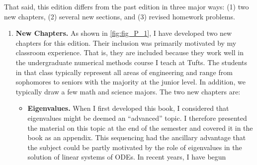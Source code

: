 \documentclass[../main.tex]{subfiles}
\begin{document}
That said, this edition differs from the past edition in three major ways: (1) two new
chapters, (2) several new sections, and (3) revised homework problems.
\begin{enumerate}
	\item  \textbf{New Chapters.} As shown in \ref{fig:fig_P_1}, I have developed two new chapters for this edition. Their inclusion was primarily motivated by my classroom experience. That is,
they are included because they work well in the undergraduate numerical methods
course I teach at Tufts. The students in that class typically represent all areas of engineering and range from sophomores to seniors with the majority at the junior level. In
addition, we typically draw a few math and science majors. The two new chapters are:
\begin{itemize}
	\item \textbf{Eigenvalues.} When I first developed this book, I considered that eigenvalues might
be deemed an “advanced” topic. I therefore presented the material on this topic at
the end of the semester and covered it in the book as an appendix. This sequencing
had the ancillary advantage that the subject could be partly motivated by the role of
eigenvalues in the solution of linear systems of ODEs. In recent years, I have begun





\end{itemize}
\end{enumerate}
\end{document}
